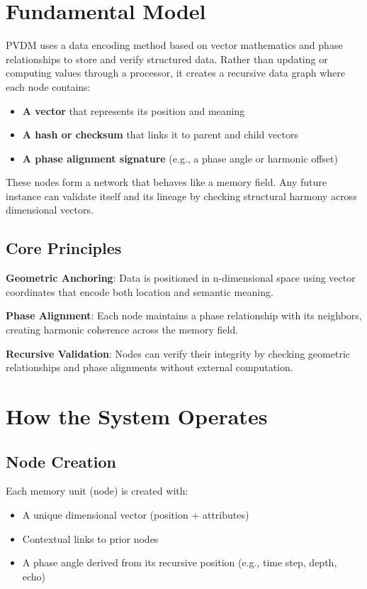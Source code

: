\documentclass[12pt,a4paper]{article}
\begin{document}
\section{Fundamental Model}

PVDM uses a data encoding method based on vector mathematics and phase relationships to store and verify structured data. Rather than updating or computing values through a processor, it creates a recursive data graph where each node contains:

\begin{itemize}
    \item \textbf{A vector} that represents its position and meaning
    \item \textbf{A hash or checksum} that links it to parent and child vectors  
    \item \textbf{A phase alignment signature} (e.g., a phase angle or harmonic offset)
\end{itemize}

These nodes form a network that behaves like a memory field. Any future instance can validate itself and its lineage by checking structural harmony across dimensional vectors.

\subsection{Core Principles}

\textbf{Geometric Anchoring}: Data is positioned in n-dimensional space using vector coordinates that encode both location and semantic meaning.

\textbf{Phase Alignment}: Each node maintains a phase relationship with its neighbors, creating harmonic coherence across the memory field.

\textbf{Recursive Validation}: Nodes can verify their integrity by checking geometric relationships and phase alignments without external computation.

\section{How the System Operates}

\subsection{Node Creation}

Each memory unit (node) is created with:

\begin{itemize}
    \item A unique dimensional vector (position + attributes)
    \item Contextual links to prior nodes
    \item A phase angle derived from its recursive position (e.g., time step, depth, echo)
\end{itemize}
\end{document}
